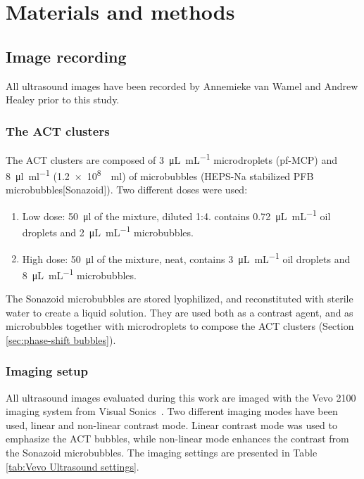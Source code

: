 \section{Materials and methods}
\subsection{Image recording}
All ultrasound images have been recorded by Annemieke van Wamel and Andrew Healey prior to this study.
\subsubsection{The ACT\texttrademark{} clusters}
The ACT\texttrademark{} clusters are composed of \SI{3}{\micro\liter\per\milli\liter} microdroplets (pf-MCP) and \SI{8}{\micro\litre\per\milli\litre} (\SI{1.2e8}{\per\milli\litre}) of microbubbles (HEPS-Na stabilized PFB microbubbles[Sonazoid\texttrademark{}]). Two different doses were used:

\begin{enumerate}
	\item Low dose: \SI{50}{\micro\litre} of the mixture, diluted 1:4. contains \SI{0.72}{\micro\liter\per\milli\liter} oil droplets and \SI{2}{\micro\liter\per\milli\liter} microbubbles.
	\item High dose: \SI{50}{\micro\litre} of the mixture, neat, contains \SI{3}{\micro\liter\per\milli\liter} oil droplets and \SI{8}{\micro\liter\per\milli\liter} microbubbles.
\end{enumerate}  
 
The Sonazoid\texttrademark{} microbubbles are stored lyophilized, and reconstituted with sterile water to create a liquid solution. They are used both as a contrast agent, and as microbubbles together with microdroplets to compose the ACT\texttrademark{} clusters (Section \ref{sec:phase-shift bubbles}).  %

\subsubsection{Imaging setup}
All ultrasound images evaluated during this work are imaged with the Vevo\texttrademark{} 2100 imaging system from Visual Sonics~\cite{Coulthard2009}. Two different imaging modes have been used, linear and non-linear contrast mode. Linear contrast mode was used to emphasize the ACT\texttrademark{} bubbles, while non-linear mode enhances the contrast from the Sonazoid\texttrademark{} microbubbles. The imaging settings are presented in Table \ref{tab:Vevo Ultrasound settings}.

